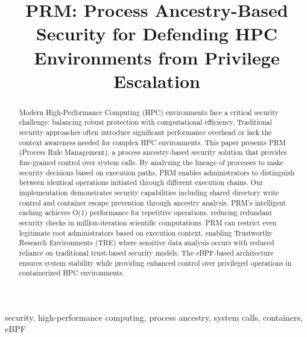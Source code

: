 \documentclass[conference]{IEEEtran}
\begin{document}
\title{PRM: Process Ancestry-Based Security for Defending HPC Environments from Privilege Escalation}

\author{
}

\maketitle

\begin{abstract}
Modern High-Performance Computing (HPC) environments face a critical security challenge: balancing robust protection with computational efficiency. Traditional security approaches often introduce significant performance overhead or lack the context awareness needed for complex HPC environments. This paper presents PRM (Process Rule Management), a process ancestry-based security solution that provides fine-grained control over system calls. By analyzing the lineage of processes to make security decisions based on execution paths, PRM enables administrators to distinguish between identical operations initiated through different execution chains. Our implementation demonstrates security capabilities including shared directory write control and container escape prevention through ancestry analysis. PRM's intelligent caching achieves O(1) performance for repetitive operations, reducing redundant security checks in million-iteration scientific computations. PRM can restrict even legitimate root administrators based on execution context, enabling Trustworthy Research Environments (TRE) where sensitive data analysis occurs with reduced reliance on traditional trust-based security models. The eBPF-based architecture ensures system stability while providing enhanced control over privileged operations in containerized HPC environments.
\end{abstract}

\begin{IEEEkeywords}
security, high-performance computing, process ancestry, system calls, containers, eBPF
\end{IEEEkeywords}
\end{document}
